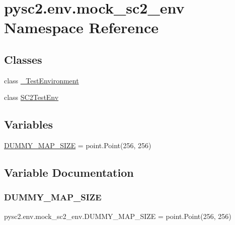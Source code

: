 \hypertarget{namespacepysc2_1_1env_1_1mock__sc2__env}{}\section{pysc2.\+env.\+mock\+\_\+sc2\+\_\+env Namespace Reference}
\label{namespacepysc2_1_1env_1_1mock__sc2__env}
\subsection*{Classes}
\begin{DoxyCompactItemize}
\item 
class \mbox{\hyperlink{classpysc2_1_1env_1_1mock__sc2__env_1_1___test_environment}{\+\_\+\+Test\+Environment}}
\item 
class \mbox{\hyperlink{classpysc2_1_1env_1_1mock__sc2__env_1_1_s_c2_test_env}{S\+C2\+Test\+Env}}
\end{DoxyCompactItemize}
\subsection*{Variables}
\begin{DoxyCompactItemize}
\item 
\mbox{\hyperlink{namespacepysc2_1_1env_1_1mock__sc2__env_a1ae509d7ab2b851e7eba50a391617a48}{D\+U\+M\+M\+Y\+\_\+\+M\+A\+P\+\_\+\+S\+I\+ZE}} = point.\+Point(256, 256)
\end{DoxyCompactItemize}


\subsection{Variable Documentation}
\mbox{\label{namespacepysc2_1_1env_1_1mock__sc2__env_a1ae509d7ab2b851e7eba50a391617a48}} 
\subsubsection{\texorpdfstring{D\+U\+M\+M\+Y\+\_\+\+M\+A\+P\+\_\+\+S\+I\+ZE}{DUMMY\_MAP\_SIZE}}
{\footnotesize\ttfamily pysc2.\+env.\+mock\+\_\+sc2\+\_\+env.\+D\+U\+M\+M\+Y\+\_\+\+M\+A\+P\+\_\+\+S\+I\+ZE = point.\+Point(256, 256)}

